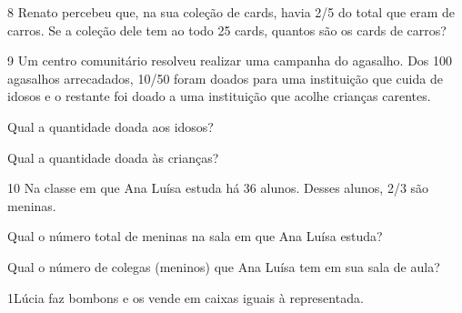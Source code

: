 
\num{8} Renato percebeu que, na sua coleção de cards, havia 2/5 do total que eram de carros. Se a coleção dele tem ao todo 25 cards,
quantos são os cards de carros?



\num{9} Um centro comunitário resolveu realizar uma campanha do agasalho.
Dos 100 agasalhos arrecadados, 10/50 foram doados para uma instituição
que cuida de idosos e o restante foi doado a uma instituição que acolhe
crianças carentes.

\begin{escolha}
\item
  Qual a quantidade doada aos idosos?


\item
  Qual a quantidade doada às crianças?

\end{escolha}


\num{10} Na classe em que Ana Luísa estuda há 36 alunos. Desses alunos, 2/3 são meninas.

\begin{escolha}
\item
  Qual o número total de meninas na sala em que Ana Luísa estuda?


\item
  Qual o número de colegas (meninos) que Ana Luísa tem em sua sala de aula?

\end{escolha}



\num{1}Lúcia faz bombons e os vende em caixas iguais à representada.

